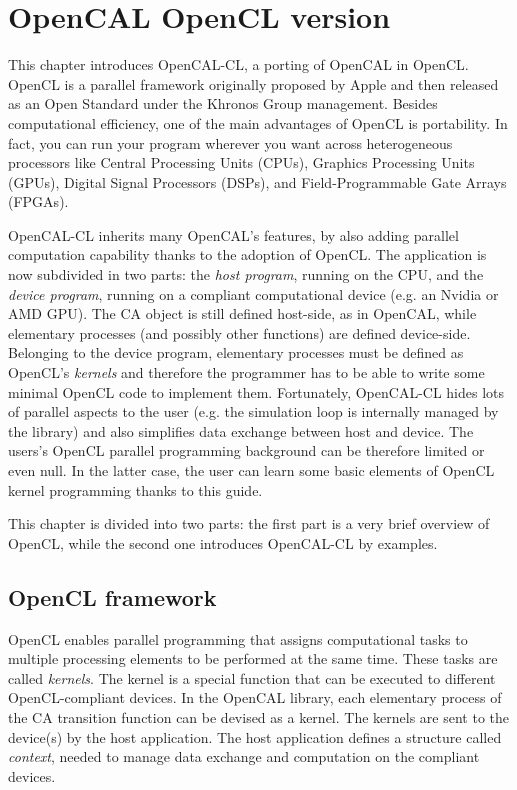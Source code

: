 \chapter{OpenCAL OpenCL version}\label{ch:opencal-cl}


This chapter introduces OpenCAL-CL, a porting of OpenCAL in OpenCL. OpenCL is a parallel framework originally proposed by Apple and then released as an Open Standard under the Khronos Group management. Besides computational efficiency, one of the main advantages of OpenCL is portability. In fact, you can run your program wherever you want across heterogeneous processors like Central Processing Units (CPUs), Graphics Processing Units (GPUs), Digital Signal Processors (DSPs), and Field-Programmable Gate Arrays (FPGAs).

OpenCAL-CL inherits many OpenCAL's features, by also adding parallel computation capability thanks to the adoption of OpenCL. The application is now subdivided in two parts: the \emph{host program}, running on the CPU, and the \emph{device program}, running on a compliant computational device (e.g. an Nvidia or AMD GPU). The CA object is still defined host-side, as in OpenCAL, while elementary processes (and possibly other functions) are defined device-side. Belonging to the device program, elementary processes must be defined as OpenCL's \emph{kernels} and therefore the programmer has to be able to write some minimal OpenCL code to implement them. Fortunately, OpenCAL-CL hides lots of parallel aspects to the user (e.g. the simulation loop is internally managed by the library) and also simplifies data exchange between host and device. The users's OpenCL parallel programming background can be therefore limited or even null. In the latter case, the user can learn some basic elements of OpenCL kernel programming thanks to this guide.

This chapter is divided into two parts: the first part is a very brief overview of OpenCL, while the second one introduces OpenCAL-CL by examples.

\section{OpenCL framework}
OpenCL enables parallel programming that assigns computational tasks to multiple processing elements to be performed at the same time. These tasks are called \emph{kernels}. The kernel is a special function that can be executed to different OpenCL-compliant devices. In the OpenCAL library, each elementary process of the CA transition function can be devised as a kernel.
The kernels are sent to the device(s) by the host application. The host application defines a structure called \emph{context}, needed to manage data exchange and computation on the compliant devices.

